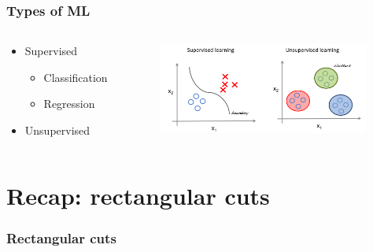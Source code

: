 \documentclass{beamer}
\begin{document}
\begin{frame}
    \frametitle{Types of ML}
    \begin{columns}[T] %
        \begin{column}{.35\textwidth}
            \begin{itemize}
                \item Supervised 
                \begin{itemize}
                    \item Classification
                    \item Regression
                \end{itemize}
                \item Unsupervised
            \end{itemize}
        \end{column}%
        \hfill%
        \begin{column}{.7\textwidth}
            \includegraphics[height=3cm,keepaspectratio]{pics/supervised_vs_unsupervised.png}%
            
        \end{column}%
    \end{columns}
\end{frame}


\section{Recap: rectangular cuts} %
\begin{frame}
    \frametitle{Rectangular cuts}
\end{frame}



 
\end{document}
